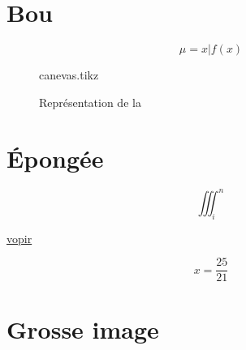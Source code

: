 \chaptertoc{}

\section{Bou}

\blindtext

\begin{equation}
\label{eq:mu}
\mu = {x|f(x)}
\end{equation}

\begin{figure}
  \begin{center}
  {canevas.tikz}
  \end{center}
  \caption{Représentation de la}
  \label{fig:1}
\end{figure}

\section{Épongée}

\begin{equation}
∭_i^n
\end{equation}

\blindtext

\hyperref[eq:mu]{vopir}

\begin{equation}
	\label{eq:1}
	x = \frac{25}{21}
\end{equation}

\section{Grosse image}
